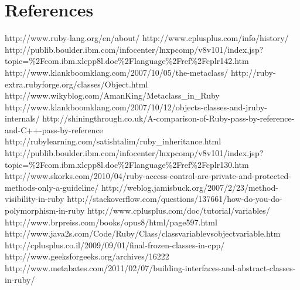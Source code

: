 \documentclass[10pt,a4paper,twocolumn]{article}
\begin{document}
\section{References}
http://www.ruby-lang.org/en/about/
http://www.cplusplus.com/info/history/
http://publib.boulder.ibm.com/infocenter/lnxpcomp/v8v101/index.jsp?topic=\%2Fcom.ibm.xlcpp8l.doc\%2Flanguage\%2Fref\%2Fcplr142.htm
http://www.klankboomklang.com/2007/10/05/the-metaclass/
http://ruby-extra.rubyforge.org/classes/Object.html
http://www.wikyblog.com/AmanKing/Metaclass_in_Ruby
http://www.klankboomklang.com/2007/10/12/objects-classes-and-jruby-internals/
http://shiningthrough.co.uk/A-comparison-of-Ruby-pass-by-reference-and-C++-pass-by-reference
http://rubylearning.com/satishtalim/ruby_inheritance.html
http://publib.boulder.ibm.com/infocenter/lnxpcomp/v8v101/index.jsp?topic=\%2Fcom.ibm.xlcpp8l.doc\%2Flanguage\%2Fref\%2Fcplr130.htm
http://www.skorks.com/2010/04/ruby-access-control-are-private-and-protected-methods-only-a-guideline/
http://weblog.jamisbuck.org/2007/2/23/method-visibility-in-ruby
http://stackoverflow.com/questions/137661/how-do-you-do-polymorphism-in-ruby
http://www.cplusplus.com/doc/tutorial/variables/
http://www.brpreiss.com/books/opus8/html/page597.html
http://www.java2s.com/Code/Ruby/Class/classvariablevsobjectvariable.htm
http://cplusplus.co.il/2009/09/01/final-frozen-classes-in-cpp/
http://www.geeksforgeeks.org/archives/16222
http://www.metabates.com/2011/02/07/building-interfaces-and-abstract-classes-in-ruby/
\end{document}
